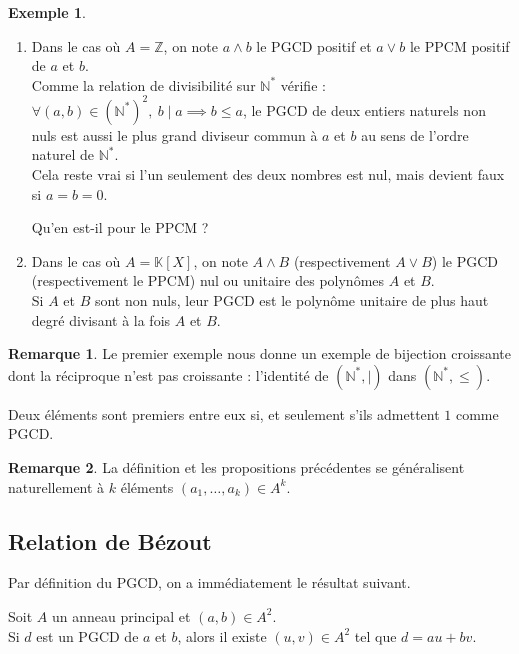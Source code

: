 \documentclass[french]{article}
\newcommand{\N}{\mathbb{N}}
\newcommand{\Z}{\mathbb{Z}}
\newcommand{\K}{\mathbb{K}}
\newcommand{\st}{^*}
\theoremstyle{plain}
\theoremstyle{definition}
\newtheorem*{ex}{Exemple}
\newtheorem*{rmq}{Remarque}
\theoremstyle{remark}
\begin{document}
\begin{ex}
	\begin{enumerate}
		\item Dans le cas où $A=\Z$, on note $a\wedge b$ le PGCD positif et $a\vee b$ le PPCM positif de $a$ et $b$. \\
		Comme la relation de divisibilité sur $\N\st$ vérifie : $\forall (a,b)\in(\N\st)^2,\ b\mid a\implies b\leqslant a$, le PGCD de deux entiers naturels non nuls est aussi le plus grand diviseur commun à $a$ et $b$ au sens de l'ordre naturel de $\N\st$.\\
		Cela reste vrai si l'un seulement des deux nombres est nul, mais devient faux si $a=b=0$.
		\begin{exo}
			Qu'en est-il pour le PPCM ?
		\end{exo}
		\item Dans le cas où $A=\K[X]$, on note $A\wedge B$ (respectivement $A\vee B$) le PGCD (respectivement le PPCM) nul ou unitaire des polynômes $A$ et $B$.\\
		Si $A$ et $B$ sont non nuls, leur PGCD est le polynôme unitaire de plus haut degré divisant à la fois $A$ et $B$.
	\end{enumerate}
\end{ex}

\begin{rmq}
	Le premier exemple nous donne un exemple de bijection croissante dont la réciproque n'est pas croissante : l'identité de $(\N\st,\mid)$ dans $(\N\st,\leqslant)$.
\end{rmq}

\begin{prop}%
	Deux éléments sont premiers entre eux si, et seulement s'ils admettent $1$ comme PGCD.
\end{prop}

\begin{rmq}
	La définition et les propositions précédentes se généralisent naturellement à $k$ éléments $(a_1,\ldots,a_k)\in A^k$.
\end{rmq}

\subsection{Relation de Bézout}

Par définition du PGCD, on a immédiatement le résultat suivant.

\begin{prop}%
	Soit $A$ un anneau principal et $(a,b)\in A^2$.\\
	Si $d$ est un PGCD de $a$ et $b$, alors il existe $(u,v)\in A^2$ tel que $d=au+bv$.
\end{prop}
\end{document}
